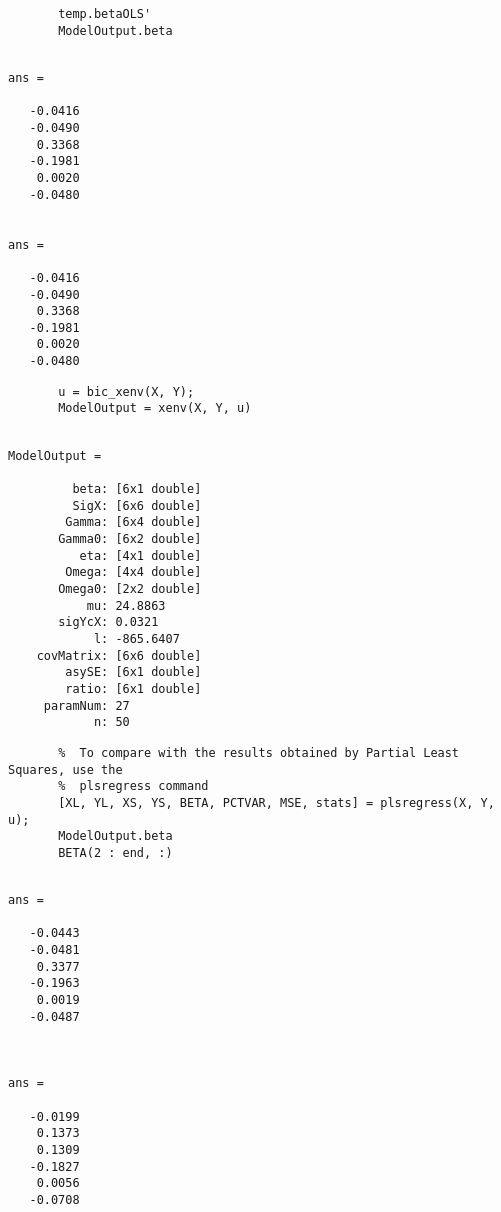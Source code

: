 \documentclass[a4paper,11pt,openany]{memoir}
\begin{document}
\begin{verbatim}       temp.betaOLS'
       ModelOutput.beta\end{verbatim}

 \color{lightgray}\ttfamily \begin{verbatim}

ans =

   -0.0416
   -0.0490
    0.3368
   -0.1981
    0.0020
   -0.0480


ans =

   -0.0416
   -0.0490
    0.3368
   -0.1981
    0.0020
   -0.0480
\end{verbatim} \rmfamily
\color{black}
    
\begin{verbatim}       u = bic_xenv(X, Y);
       ModelOutput = xenv(X, Y, u)\end{verbatim}

\color{lightgray}\ttfamily \begin{verbatim}

ModelOutput = 

         beta: [6x1 double]
         SigX: [6x6 double]
        Gamma: [6x4 double]
       Gamma0: [6x2 double]
          eta: [4x1 double]
        Omega: [4x4 double]
       Omega0: [2x2 double]
           mu: 24.8863
       sigYcX: 0.0321
            l: -865.6407
    covMatrix: [6x6 double]
        asySE: [6x1 double]
        ratio: [6x1 double]
     paramNum: 27
            n: 50
\end{verbatim} \rmfamily
\color{black}
    
\begin{verbatim}       %  To compare with the results obtained by Partial Least Squares, use the 
       %  plsregress command
       [XL, YL, XS, YS, BETA, PCTVAR, MSE, stats] = plsregress(X, Y, u);
       ModelOutput.beta
       BETA(2 : end, :)\end{verbatim}
    

        \color{lightgray}\ttfamily \begin{verbatim}

ans =

   -0.0443
   -0.0481
    0.3377
   -0.1963
    0.0019
   -0.0487



ans =

   -0.0199
    0.1373
    0.1309
   -0.1827
    0.0056
   -0.0708

\end{verbatim} \rmfamily
\color{black}
\end{document}
